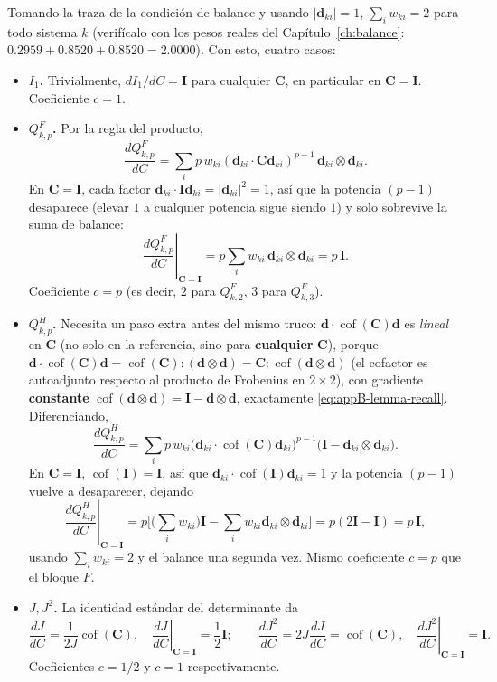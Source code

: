 \documentclass[11pt,a4paper]{article}
\newcommand{\Cof}{\operatorname{cof}}
\begin{document}
Tomando la traza de la condici\'on de balance y usando $|\bm d_{ki}|=1$,
$\sum_iw_{ki}=2$ para todo sistema $k$ (verif\'icalo con los pesos
reales del Cap\'itulo~\ref{ch:balance}:
$0.2959+0.8520+0.8520=2.0000$). Con esto, cuatro casos:

\begin{itemize}
\item \textbf{$I_1$.} Trivialmente, $dI_1/dC=\bm I$ para cualquier
$\bm C$, en particular en $\bm C=\bm I$. Coeficiente $c=1$.

\item \textbf{$Q_{k,p}^F$.} Por la regla del producto,
\[
 \frac{dQ_{k,p}^F}{dC}=\sum_ip\,w_{ki}(\bm d_{ki}\cdot\bm C\bm d_{ki})^{p-1}\,\bm d_{ki}\otimes\bm d_{ki}.
\]
En $\bm C=\bm I$, cada factor $\bm d_{ki}\cdot\bm I\bm d_{ki}=|\bm d_{ki}|^2=1$,
as\'i que la potencia $(p-1)$ desaparece (elevar $1$ a cualquier
potencia sigue siendo $1$) y solo sobrevive la suma de balance:
\[
 \left.\frac{dQ_{k,p}^F}{dC}\right|_{\bm C=\bm I}=p\sum_iw_{ki}\,\bm d_{ki}\otimes\bm d_{ki}=p\,\bm I.
\]
Coeficiente $c=p$ (es decir, $2$ para $Q_{k,2}^F$, $3$ para $Q_{k,3}^F$).

\item \textbf{$Q_{k,p}^H$.} Necesita un paso extra antes del mismo
truco: $\bm d\cdot\Cof(\bm C)\bm d$ es \emph{lineal} en $\bm C$ (no
solo en la referencia, sino para \textbf{cualquier} $\bm C$), porque
$\bm d\cdot\Cof(\bm C)\bm d=\Cof(\bm C):(\bm d\otimes\bm d)=\bm C:\Cof(\bm d\otimes\bm d)$
(el cofactor es autoadjunto respecto al producto de Frobenius en
$2\times2$), con gradiente \textbf{constante}
$\Cof(\bm d\otimes\bm d)=\bm I-\bm d\otimes\bm d$, exactamente
\eqref{eq:appB-lemma-recall}. Diferenciando,
\[
 \frac{dQ_{k,p}^H}{dC}=\sum_ip\,w_{ki}\big(\bm d_{ki}\cdot\Cof(\bm C)\bm d_{ki}\big)^{p-1}\big(\bm I-\bm d_{ki}\otimes\bm d_{ki}\big).
\]
En $\bm C=\bm I$, $\Cof(\bm I)=\bm I$, as\'i que
$\bm d_{ki}\cdot\Cof(\bm I)\bm d_{ki}=1$ y la potencia $(p-1)$ vuelve a
desaparecer, dejando
\[
 \left.\frac{dQ_{k,p}^H}{dC}\right|_{\bm C=\bm I}
 =p\Big[\Big(\textstyle\sum_iw_{ki}\Big)\bm I-\sum_iw_{ki}\bm d_{ki}\otimes\bm d_{ki}\Big]
 =p(2\bm I-\bm I)=p\,\bm I,
\]
usando $\sum_iw_{ki}=2$ y el balance una segunda vez. Mismo
coeficiente $c=p$ que el bloque $F$.

\item \textbf{$J,J^2$.} La identidad est\'andar del determinante da
\[
 \frac{dJ}{dC}=\frac1{2J}\Cof(\bm C),\quad
 \left.\frac{dJ}{dC}\right|_{\bm C=\bm I}=\frac12\bm I;
 \qquad
 \frac{dJ^2}{dC}=2J\frac{dJ}{dC}=\Cof(\bm C),\quad
 \left.\frac{dJ^2}{dC}\right|_{\bm C=\bm I}=\bm I.
\]
Coeficientes $c=1/2$ y $c=1$ respectivamente.
\end{itemize}
\end{document}
